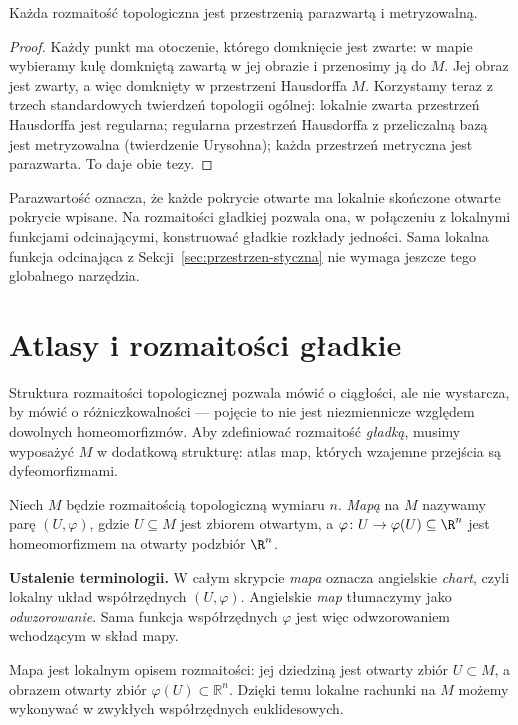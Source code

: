 \begin{fakt}
Każda rozmaitość topologiczna jest przestrzenią parazwartą i metryzowalną.
\end{fakt}

\begin{proof}
Każdy punkt ma otoczenie, którego domknięcie jest zwarte: w mapie
wybieramy kulę domkniętą zawartą w jej obrazie i przenosimy ją do $M$.
Jej obraz jest zwarty, a więc domknięty w przestrzeni Hausdorffa $M$.
Korzystamy teraz z trzech standardowych twierdzeń topologii ogólnej:
lokalnie zwarta przestrzeń Hausdorffa jest regularna;
regularna przestrzeń Hausdorffa z przeliczalną bazą jest metryzowalna
(twierdzenie Urysohna); każda przestrzeń metryczna jest parazwarta.
To daje obie tezy.
\end{proof}
Parazwartość oznacza, że każde pokrycie otwarte ma lokalnie skończone
otwarte pokrycie wpisane. Na rozmaitości gładkiej pozwala ona,
w połączeniu z lokalnymi funkcjami odcinającymi, konstruować gładkie
rozkłady jedności. Sama lokalna funkcja odcinająca z
Sekcji~\ref{sec:przestrzen-styczna} nie wymaga jeszcze tego globalnego narzędzia.

\section{Atlasy i rozmaitości gładkie}\label{sec:atlas}

Struktura rozmaitości topologicznej pozwala mówić o ciągłości, ale nie wystarcza, by mówić
o różniczkowalności — pojęcie to nie jest niezmiennicze względem dowolnych homeomorfizmów.
Aby zdefiniować rozmaitość \emph{gładką}, musimy wyposażyć $M$ w dodatkową strukturę: atlas
map, których wzajemne przejścia są dyfeomorfizmami.

\begin{definicja}
Niech $M$ będzie rozmaitością topologiczną wymiaru $n$. \emph{Mapą} na $M$
nazywamy parę $(U,\varphi)$, gdzie $U\subseteq M$ jest zbiorem otwartym, a
$\varphi\colon U\to\varphi(U)\subseteq\R^n$ jest homeomorfizmem na otwarty podzbiór $\R^n$.
\end{definicja}

\noindent\textbf{Ustalenie terminologii.}
W całym skrypcie \emph{mapa} oznacza angielskie \emph{chart},
czyli lokalny układ współrzędnych $(U,\varphi)$.
Angielskie \emph{map} tłumaczymy jako \emph{odwzorowanie}.
Sama funkcja współrzędnych $\varphi$ jest więc odwzorowaniem
wchodzącym w skład mapy.

\begin{uwaga}
Mapa jest lokalnym opisem rozmaitości: jej dziedziną jest otwarty zbiór $U\subset M$,
a obrazem otwarty zbiór $\varphi(U)\subset\mathbb R^n$. Dzięki temu lokalne rachunki na $M$
możemy wykonywać w zwykłych współrzędnych euklidesowych.
\end{uwaga}

